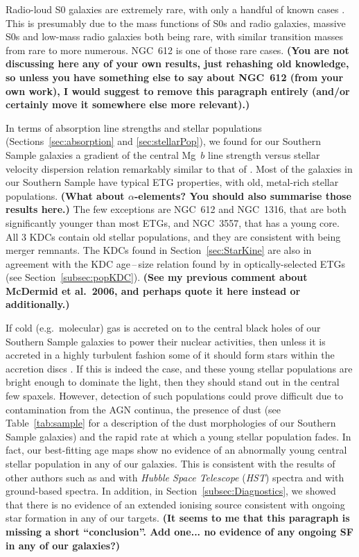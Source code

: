 \documentclass[a4paper,fleqn,usenatbib]{mnras}
\DeclareRobustCommand{\removed}[1]{{\sethlcolor{red}\hl{#1}}}
\DeclareRobustCommand{\added}[1]{{\sethlcolor{green}\hl{#1}}}
\begin{document}
Radio-loud S0 galaxies are extremely rare, with only a handful of
known cases \citep[e.g.][]{Heckman1982, Morganti2011}. This is
presumably due to the mass functions of S0s and radio galaxies,
massive S0s and low-mass radio galaxies both being rare, with similar
transition masses from rare to more numerous. NGC~612 is one of those
rare cases. {\bf (You are not discussing here any of your own results,
  just rehashing old knowledge, so unless you have something else to
  say about NGC~612 (from your own work), I would suggest to remove
  this paragraph entirely (and/or certainly move it somewhere else
  more relevant).)}

In terms of absorption line strengths and stellar populations
(Sections~\ref{sec:absorption} and \ref{sec:stellarPop}), we found for
our Southern Sample galaxies a gradient of the central Mg~$b$ line
strength versus stellar velocity dispersion relation remarkably
similar to that of \citet{Ziegler1997}. Most of the galaxies in our
Southern Sample have typical ETG properties, with old, metal-rich
stellar populations. {\bf (What about $\alpha$-elements? You should
  also summarise those results here.)} The few exceptions are NGC~612
and NGC~1316, that are both significantly younger than most ETGs, and
NGC~3557, that has a young core. All $3$ KDCs contain old stellar
populations, and they are consistent with being merger remnants. The
KDCs found in Section~\ref{sec:StarKine} are also in agreement with
the KDC age\,--\,size relation found by \added{\citet{McDermid2006}} 
\removed{\citet{Kuntschner2010}} in optically-selected ETGs (see 
Section~\ref{subsec:popKDC}). {\bf (See my previous comment about 
McDermid et al.\ 2006, and perhaps quote it here instead or 
additionally.)}

If cold (e.g.\ molecular) gas is accreted on to the central black
holes of our Southern Sample galaxies to power their nuclear
activities, then unless it is accreted in a highly turbulent fashion
some of it should form stars within the accretion discs
\citep[e.g.][]{Collin1999, Diamond-Stanic2012, LaMassa2013}. If this
is indeed the case, and these young stellar populations are bright
enough to dominate the light, then they should stand out in the
central few spaxels. However, detection of such populations could
prove difficult due to contamination from the AGN continua, the
presence of dust (see Table~\ref{tab:sample} for a description of the
dust morphologies of our Southern Sample galaxies) and the rapid rate
at which a young stellar population fades. In fact, our best-fitting
age maps show no evidence of an abnormally young central stellar
population in any of our galaxies. This is consistent with the results
of other authors such as \citet{GonzalezDelgado2004} and
\citet{Sarzi2005b} with \textit{Hubble Space Telescope} (\textit{HST})
spectra and \citet{CidFernandes2004} with ground-based spectra. In
addition, in Section~\ref{subsec:Diagnostics}, we showed that there is
no evidence of an extended ionising source consistent with ongoing
star formation in any of our targets. {\bf (It seems to me that this
  paragraph is missing a short ``conclusion''. Add one... no evidence
  of any ongoing SF in any of our galaxies?)}
\end{document}
